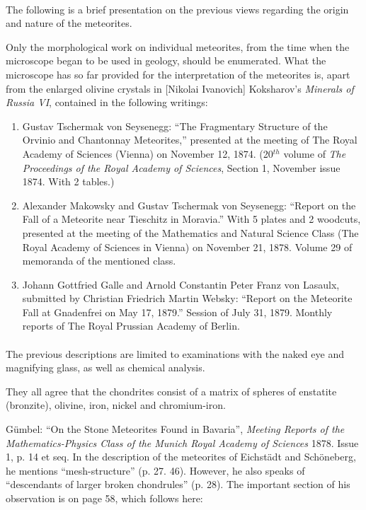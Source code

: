 \documentclass[a4paper, 12pt, oneside]{article}
\begin{document}
\paragraph{}
The following is a brief presentation on the previous views regarding the origin and nature of the meteorites.

Only the morphological work on individual meteorites, from the time when the microscope began to be used in geology, should be enumerated. What the microscope has so far provided for the interpretation of the meteorites is, apart from the enlarged olivine crystals in [Nikolai Ivanovich] Koksharov's \emph{Minerals of Russia VI}, contained in the following writings:
\begin{enumerate}
    \item Gustav Tschermak von Seysenegg: ``The Fragmentary Structure of the Orvinio and Chantonnay Meteorites,'' presented at the meeting of The Royal Academy of Sciences (Vienna) on November 12, 1874. (20$^{th}$ volume of \emph{The Proceedings of the Royal Academy of Sciences}, Section 1, November issue 1874. With 2 tables.)
    \item Alexander Makowsky and Gustav Tschermak von Seysenegg: ``Report on the Fall of a Meteorite near Tieschitz in Moravia.'' With 5 plates and 2 woodcuts, presented at the meeting of the Mathematics and Natural Science Class (The Royal Academy of Sciences in Vienna) on November 21, 1878. Volume 29 of memoranda of the mentioned class.
    \item Johann Gottfried Galle and Arnold Constantin Peter Franz von Lasaulx, submitted by Christian Friedrich Martin Websky: ``Report on the Meteorite Fall at Gnadenfrei on May 17, 1879.'' Session of July 31, 1879. Monthly reports of The Royal Prussian Academy of Berlin.
\end{enumerate}
\paragraph{}
The previous descriptions are limited to examinations with the naked eye and magnifying glass, as well as chemical analysis.

They all agree that the chondrites consist of a matrix of spheres of enstatite (bronzite), olivine, iron, nickel and chromium-iron.

Gümbel: ``On the Stone Meteorites Found in Bavaria'', \emph{Meeting Reports of the Mathematics-Physics Class of the Munich Royal Academy of Sciences} 1878. Issue 1, p. 14 et seq. In the description of the meteorites of Eichstädt and Schöneberg, he mentions ``mesh-structure'' (p. 27. 46). However, he also speaks of ``descendants of larger broken chondrules'' (p. 28). The important section of his observation is on page 58, which follows here:
\end{document}
